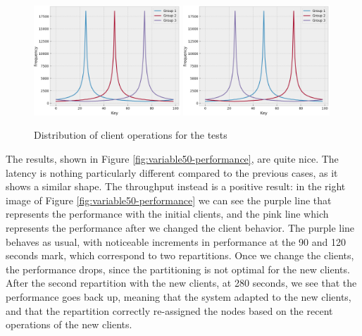 \begin{figure}[!htb]
  \centering
  \includegraphics[width=0.49\textwidth,height=\textheight,keepaspectratio]{img/clients_loads.png}
  \includegraphics[width=0.49\textwidth,height=\textheight,keepaspectratio]{img/clients_loads_variable.png}
  \caption{ Distribution of client operations for the tests }
  \label{fig:variable-loads}
\end{figure}
The results, shown in Figure \ref{fig:variable50-performance}, are quite nice. The latency is nothing particularly different compared to the previous cases, as it shows a similar shape. The throughput instead is a positive result: in the right image of Figure \ref{fig:variable50-performance} we can see the purple line that represents the performance with the initial clients, and the pink line which represents the performance after we changed the client behavior. The purple line behaves as usual, with noticeable increments in performance at the 90 and 120 seconds mark, which correspond to two repartitions. Once we change the clients, the performance drops, since the partitioning is not optimal for the new clients. After the second repartition with the new clients, at 280 seconds, we see that the performance goes back up, meaning that the system adapted to the new clients, and that the repartition correctly re-assigned the nodes based on the recent operations of the new clients.

